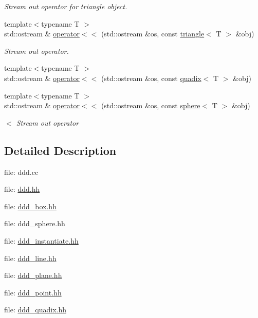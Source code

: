 \begin{DoxyCompactItemize}
\begin{DoxyCompactList}\small\item\em Stream out operator for triangle object. \end{DoxyCompactList}\item 
{\footnotesize template$<$typename T $>$ }\\std\+::ostream \& \hyperlink{namespaceddd_a3a6f828f85e4fa306f0d950f1aab4f64}{operator$<$$<$} (std\+::ostream \&os, const \hyperlink{classddd_1_1triangle}{triangle}$<$ T $>$ \&obj)
\begin{DoxyCompactList}\small\item\em Stream out operator. \end{DoxyCompactList}\item 
{\footnotesize template$<$typename T $>$ }\\std\+::ostream \& \hyperlink{namespaceddd_a58ae88cefdf3b919e400db6de59f4cfc}{operator$<$$<$} (std\+::ostream \&os, const \hyperlink{classddd_1_1quadix}{quadix}$<$ T $>$ \&obj)
\item 
{\footnotesize template$<$typename T $>$ }\\std\+::ostream \& \hyperlink{namespaceddd_a64dbb41c0ee377eb528907f3448514f6}{operator$<$$<$} (std\+::ostream \&os, const \hyperlink{classddd_1_1sphere}{sphere}$<$ T $>$ \&obj)
\begin{DoxyCompactList}\small\item\em $<$ Stream out operator \end{DoxyCompactList}\end{DoxyCompactItemize}


\subsection{Detailed Description}
file\+: ddd.\+cc

file\+: \hyperlink{ddd_8hh_source}{ddd.\+hh}

file\+: \hyperlink{ddd__box_8hh_source}{ddd\+\_\+box.\+hh}

file\+: ddd\+\_\+sphere.\+hh

file\+: \hyperlink{ddd__instantiate_8hh_source}{ddd\+\_\+instantiate.\+hh}

file\+: \hyperlink{ddd__line_8hh_source}{ddd\+\_\+line.\+hh}

file\+: \hyperlink{ddd__plane_8hh_source}{ddd\+\_\+plane.\+hh}

file\+: \hyperlink{ddd__point_8hh_source}{ddd\+\_\+point.\+hh}

file\+: \hyperlink{ddd__quadix_8hh_source}{ddd\+\_\+quadix.\+hh}

